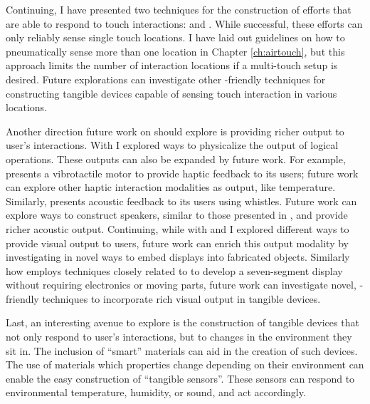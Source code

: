       Continuing, I have presented two techniques for the construction of
      efforts that are able to respond to touch interactions: \at and \al. While
      successful, these efforts can only reliably sense single touch locations.
      I have laid out guidelines on how to pneumatically sense more than one
      location in Chapter \ref{ch:airtouch}, but this approach limits the number
      of interaction locations if a multi-touch setup is desired. Future
      explorations can investigate other \pap-friendly techniques for
      constructing tangible devices capable of sensing touch interaction in
      various locations.

      Another direction future work on \papf should explore is providing richer
      output to user's interactions. With \al I explored ways to physicalize the
      output of logical operations. These outputs can also be expanded by future
      work. For example, \al presents a vibrotactile motor to provide haptic
      feedback to its users; future work can explore other haptic interaction
      modalities as output, like temperature. Similarly, \al presents acoustic
      feedback to its users using whistles. Future work can explore \pap ways to
      construct speakers, similar to those presented in \cite{Ishiguro:2014},
      and provide richer acoustic output. Continuing, while with \al and \mp I
      explored different ways to provide visual output to users, future work can
      enrich this output modality by investigating in novel ways to embed
      displays into fabricated objects. Similarly how \cite{VanDerHeyden:1969}
      employs techniques closely related to \al to develop a seven-segment
      display without requiring electronics or moving parts, future work can
      investigate novel, \pap-friendly techniques to incorporate rich visual
      output in tangible devices.
      
      Last, an interesting avenue to explore is the construction of tangible
      devices that not only respond to user's interactions, but to changes in
      the environment they sit in. The inclusion of ``smart'' materials can aid
      in the creation of such devices. The use of materials which properties
      change depending on their environment can enable the easy construction of
      ``tangible sensors''. These sensors can respond to environmental
      temperature, humidity, or sound, and act accordingly.

